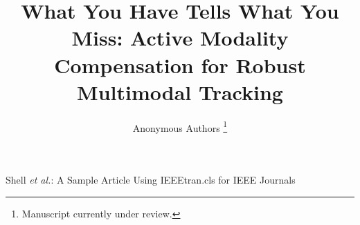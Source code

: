 \documentclass[lettersize,journal]{IEEEtran}
\begin{document}
\title{What You Have Tells What You Miss: Active Modality Compensation for Robust Multimodal Tracking}

\author{Anonymous Authors
\thanks{Manuscript currently under review.}}

%
{Shell \MakeLowercase{\textit{et al.}}: A Sample Article Using IEEEtran.cls for IEEE Journals}


\maketitle








 

\newpage
{
    \small
    
    
}


\end{document}
